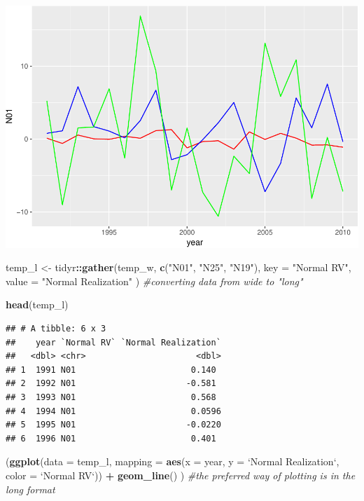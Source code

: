 \documentclass[]{article}
\newenvironment{Shaded}{\begin{snugshade}}{\end{snugshade}}
\newcommand{\KeywordTok}[1]{\textcolor[rgb]{0.13,0.29,0.53}{\textbf{#1}}}
\newcommand{\DataTypeTok}[1]{\textcolor[rgb]{0.13,0.29,0.53}{#1}}
\newcommand{\StringTok}[1]{\textcolor[rgb]{0.31,0.60,0.02}{#1}}
\newcommand{\CommentTok}[1]{\textcolor[rgb]{0.56,0.35,0.01}{\textit{#1}}}
\newcommand{\OperatorTok}[1]{\textcolor[rgb]{0.81,0.36,0.00}{\textbf{#1}}}
\newcommand{\NormalTok}[1]{#1}
\begin{document}
\includegraphics{Intro_ggplot_files/figure-latex/wide_vs_long-1.pdf}

\begin{Shaded}
\begin{Highlighting}[]
\NormalTok{temp_l <-}\StringTok{ }\NormalTok{tidyr}\OperatorTok{::}\KeywordTok{gather}\NormalTok{(temp_w, }\KeywordTok{c}\NormalTok{(}\StringTok{"N01"}\NormalTok{, }\StringTok{"N25"}\NormalTok{, }\StringTok{"N19"}\NormalTok{), }
                        \DataTypeTok{key =} \StringTok{"Normal RV"}\NormalTok{, }
                        \DataTypeTok{value =} \StringTok{"Normal Realization"}
\NormalTok{                        ) }\CommentTok{#converting data from wide to "long"}

\KeywordTok{head}\NormalTok{(temp_l)}
\end{Highlighting}
\end{Shaded}

\begin{verbatim}
## # A tibble: 6 x 3
##    year `Normal RV` `Normal Realization`
##   <dbl> <chr>                      <dbl>
## 1  1991 N01                       0.140 
## 2  1992 N01                      -0.581 
## 3  1993 N01                       0.568 
## 4  1994 N01                       0.0596
## 5  1995 N01                      -0.0220
## 6  1996 N01                       0.401
\end{verbatim}

\begin{Shaded}
\begin{Highlighting}[]
\NormalTok{(}\KeywordTok{ggplot}\NormalTok{(}\DataTypeTok{data =}\NormalTok{ temp_l,}
        \DataTypeTok{mapping =} \KeywordTok{aes}\NormalTok{(}\DataTypeTok{x =}\NormalTok{ year, }
                      \DataTypeTok{y =} \StringTok{`}\DataTypeTok{Normal Realization}\StringTok{`}\NormalTok{,}
                      \DataTypeTok{color =} \StringTok{`}\DataTypeTok{Normal RV}\StringTok{`}\NormalTok{)) }\OperatorTok{+}
\StringTok{    }\KeywordTok{geom_line}\NormalTok{()}
\NormalTok{  ) }\CommentTok{#the preferred way of plotting is in the long format}
\end{Highlighting}
\end{Shaded}
\end{document}
